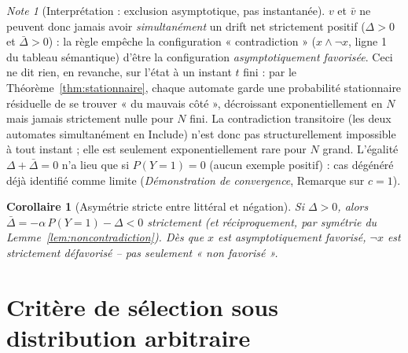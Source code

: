 \documentclass[12pt,a4paper]{article}
\newtheorem{corollary}[theorem]{Corollaire}
\theoremstyle{remark}
\newtheorem{note}{Note}[section]
\newcommand{\Inc}{\ensuremath{\mathrm{Include}}}
\newcommand{\vbar}{\bar{v}}
\begin{document}
\begin{note}[Interprétation : exclusion asymptotique, pas instantanée]
$v$ et $\vbar$ ne peuvent donc jamais avoir \emph{simultanément} un drift net
strictement positif ($\Delta>0$ et $\bar\Delta>0$) : la règle empêche la
configuration « contradiction » ($x\wedge\neg x$, ligne 1 du tableau
sémantique) d'être la configuration \emph{asymptotiquement favorisée}. Ceci ne
dit rien, en revanche, sur l'état à un instant $t$ fini : par le
Théorème~\ref{thm:stationnaire}, chaque automate garde une probabilité
stationnaire résiduelle de se trouver « du mauvais côté », décroissant
exponentiellement en $N$ mais jamais strictement nulle pour $N$ fini. La
contradiction transitoire (les deux automates simultanément en $\Inc$) n'est
donc pas structurellement impossible à tout instant ; elle est seulement
exponentiellement rare pour $N$ grand. L'égalité $\Delta+\bar\Delta=0$ n'a lieu
que si $P(Y{=}1)=0$ (aucun exemple positif) : cas dégénéré déjà identifié comme
limite (\textit{Démonstration de convergence}, Remarque sur $c=1$).
\end{note}

\begin{corollary}[Asymétrie stricte entre littéral et négation]\label{cor:asymetrie}
Si $\Delta>0$, alors $\bar\Delta = -\alpha\,P(Y{=}1) - \Delta < 0$
strictement (et réciproquement, par symétrie du Lemme~\ref{lem:noncontradiction}).
Dès que $x$ est asymptotiquement favorisé, $\neg x$ est \emph{strictement}
défavorisé -- pas seulement « non favorisé ».
\end{corollary}

\section{Critère de sélection sous distribution arbitraire}
\end{document}
